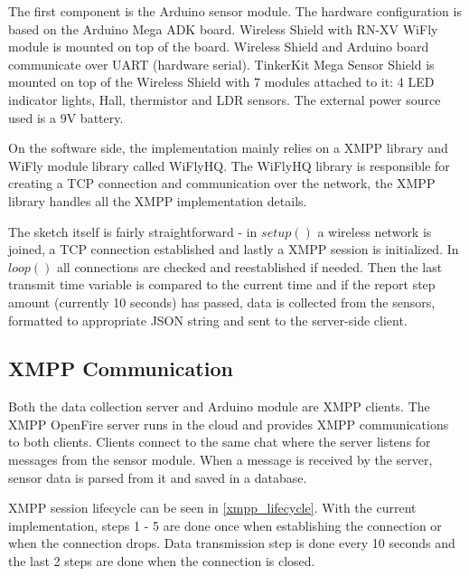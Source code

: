 The first component is the Arduino sensor module. The hardware configuration is based on the Arduino Mega ADK board. Wireless Shield with RN-XV WiFly module is mounted on top of the board. Wireless Shield and Arduino board communicate over UART (hardware serial). TinkerKit Mega Sensor Shield is mounted on top of the Wireless Shield with 7 modules attached to it: 4 LED indicator lights, Hall, thermistor and LDR sensors. The external power source used is a 9V battery.

On the software side, the implementation mainly relies on a XMPP library and WiFly module library called WiFlyHQ. The WiFlyHQ library is responsible for creating a TCP connection and communication over the network, the XMPP library handles all the XMPP implementation details. 

The sketch itself is fairly straightforward - in $setup()$ a wireless network is joined, a TCP connection established and lastly a XMPP session is initialized. In $loop()$ all connections are checked and reestablished if needed. Then the last transmit time variable is compared to the current time and if the report step amount (currently 10 seconds) has passed, data is collected from the sensors, formatted to appropriate JSON string and sent to the server-side client. 

\subsection{XMPP Communication}

Both the data collection server and Arduino module are XMPP clients. The XMPP OpenFire server runs in the cloud and provides XMPP communications to both clients. Clients connect to the same chat where the server listens for messages from the sensor module. When a message is received by the server, sensor data is parsed from it and saved in a database.

XMPP session lifecycle can be seen in \autoref{xmpp_lifecycle}. With the current implementation, steps 1 - 5 are done once when establishing the connection or when the connection drops. Data transmission step is done every 10 seconds and the last 2 steps are done when the connection is closed.

